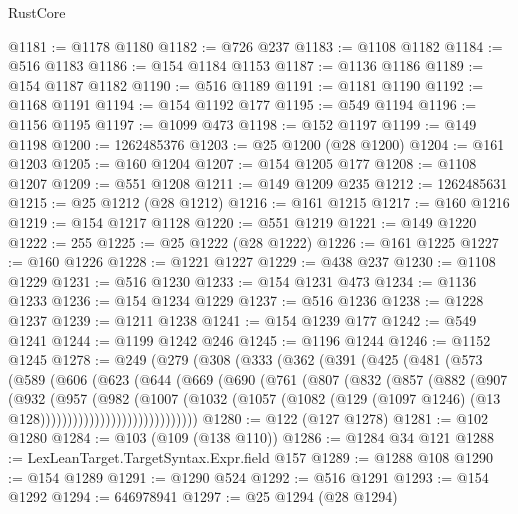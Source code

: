 \begin{lexlean}{RustCore}
\begin{coremodule}
@1181 := @1178 @1180
@1182 := @726 @237
@1183 := @1108 @1182
@1184 := @516 @1183
@1186 := @154 @1184 @1153
@1187 := @1136 @1186
@1189 := @154 @1187 @1182
@1190 := @516 @1189
@1191 := @1181 @1190
@1192 := @1168 @1191
@1194 := @154 @1192 @177
@1195 := @549 @1194
@1196 := @1156 @1195
@1197 := @1099 @473
@1198 := @152 @1197
@1199 := @149 @1198
@1200 := 1262485376
@1203 := @25 @1200 (@28 @1200)
@1204 := @161 @1203
@1205 := @160 @1204
@1207 := @154 @1205 @177
@1208 := @1108 @1207
@1209 := @551 @1208
@1211 := @149 @1209 @235
@1212 := 1262485631
@1215 := @25 @1212 (@28 @1212)
@1216 := @161 @1215
@1217 := @160 @1216
@1219 := @154 @1217 @1128
@1220 := @551 @1219
@1221 := @149 @1220
@1222 := 255
@1225 := @25 @1222 (@28 @1222)
@1226 := @161 @1225
@1227 := @160 @1226
@1228 := @1221 @1227
@1229 := @438 @237
@1230 := @1108 @1229
@1231 := @516 @1230
@1233 := @154 @1231 @473
@1234 := @1136 @1233
@1236 := @154 @1234 @1229
@1237 := @516 @1236
@1238 := @1228 @1237
@1239 := @1211 @1238
@1241 := @154 @1239 @177
@1242 := @549 @1241
@1244 := @1199 @1242 @246
@1245 := @1196 @1244
@1246 := @1152 @1245
@1278 := @249
    (@279
      (@308
        (@333
          (@362
            (@391
              (@425
                (@481
                  (@573
                    (@589
                      (@606
                        (@623
                          (@644
                            (@669
                              (@690
                                (@761
                                  (@807
                                    (@832
                                      (@857
                                        (@882
                                          (@907
                                            (@932
                                              (@957
                                                (@982
                                                  (@1007
                                                    (@1032
                                                      (@1057
                                                        (@1082
                                                          (@129
                                                            (@1097 @1246)
                                                            (@13 @128)))))))))))))))))))))))))))))
@1280 := @122 (@127 @1278)
@1281 := @102 @1280
@1284 := @103 (@109 (@138 @110))
@1286 := @1284 @34 @121
@1288 := LexLeanTarget.TargetSyntax.Expr.field @157
@1289 := @1288 @108
@1290 := @154 @1289
@1291 := @1290 @524
@1292 := @516 @1291
@1293 := @154 @1292
@1294 := 646978941
@1297 := @25 @1294 (@28 @1294)

\end{coremodule}
\end{lexlean}
